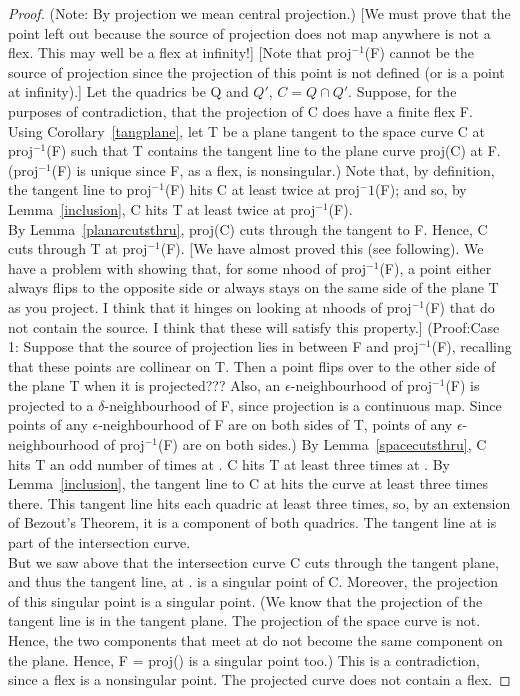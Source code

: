 \begin{proof}\nopagebreak
(Note:  By projection we mean central projection.)
[We must prove that the point left out because the source of
projection does not map
anywhere is not a flex. This may well be a flex at infinity!]
[Note that proj$^{-1}$(F) cannot be the source of projection since
the projection of this point is not defined (or is a point at infinity).]
Let the quadrics be Q and $Q'$, $C = Q \cap Q'$.
Suppose, for the purposes of contradiction, that the projection of
C does have a finite flex F. \\
Using Corollary~\ref{tangplane}, let T be a plane tangent to the space
curve C at proj$^{-1}$(F) such that T contains the tangent line to the 
plane curve proj(C) at F.
(proj$^{-1}$(F) is unique since F, as a flex, is nonsingular.)
Note that, by definition, the tangent line to proj$^{-1}$(F) hits C
at least twice at proj${^-1}$(F); and so, by Lemma~\ref{inclusion},
C hits T at least twice at proj$^{-1}$(F). \\
By Lemma~\ref{planarcutsthru}, proj(C) cuts through the tangent to F.
Hence, C cuts through T at proj$^{-1}$(F).
[We have almost proved this (see following).  We have a problem with
showing that, for some nhood of proj$^{-1}$(F), a point either always
flips to the opposite side or always stays on the same side of the plane
T as you project.  I think that it hinges on looking at nhoods of
proj$^{-1}$(F) that do not contain the source.  I think that
these will satisfy this property.]
(Proof:Case 1: Suppose that the source of projection lies in between
F and proj$^{-1}$(F), recalling that these points are collinear on T.
Then a point flips over to the other side of the plane T when it is projected???
Also, an $\epsilon$-neighbourhood of proj$^{-1}$(F) is projected to a
$\delta$-neighbourhood of F, since projection is a continuous map.
Since points of any $\epsilon$-neighbourhood of F are on both sides of T,
points of any $\epsilon$-neighbourhood of proj$^{-1}$(F) are on both sides.)
\hence By Lemma~\ref{spacecutsthru}, C hits T an odd number of times at
\projinvF.
\hence C hits T at least three times at \projinvF.
\hence By Lemma~\ref{inclusion}, the tangent line to C at \projinvF
hits the curve at least three times there.
\hence This tangent line hits each quadric at least three times, so,
by an extension of Bezout's Theorem, it is a component of both quadrics.
\hence The tangent line at \projinvF is part of the intersection curve. \\
But we saw above that the intersection curve C cuts through the tangent plane,
and thus the tangent line, at \projinvF.
\hence \projinvF is a singular point of C.
Moreover, the projection of this singular point is a singular point.
(We know that the projection of the tangent line is in the tangent plane.
The projection of the space curve is not.
Hence, the two components that meet at \projinvF do not become the same
component on the plane.
Hence, F = proj(\projinvF) is a singular point too.)
This is a contradiction, since a flex is a nonsingular point.
\hence The projected curve does not contain a flex.
\end{proof}
